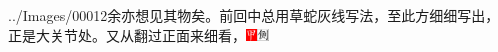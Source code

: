 {{../Images/00012}\footnotesize \kaishu 余亦想见其物矣。前回中总用草蛇灰线写法，至此方细细写出，正是大关节处。}又从翻过正面来细看，{\includegraphics[width=3mm]{../Images/00002}\includegraphics[width=3mm]{../Images/00011}\fo}
